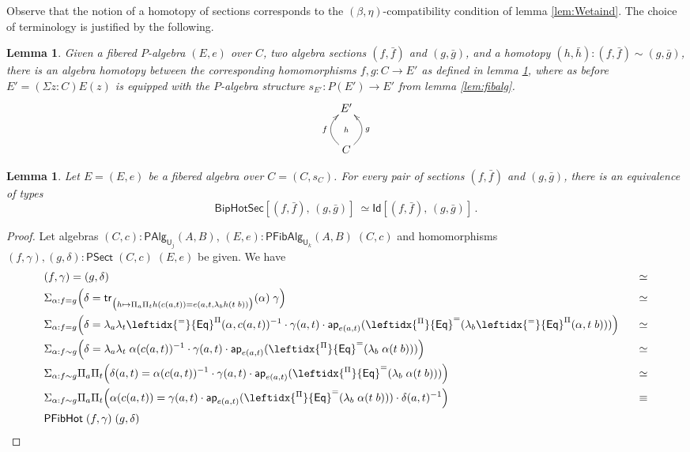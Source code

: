 \documentclass[10pt,a4paper,oneside,reqno]{amsart}
\numberwithin{equation}{section}
\theoremstyle{mythm}
\newtheorem{lemma}[theorem]{Lemma}
\theoremstyle{mydef}
\theoremstyle{myrmk}
\newcommand{\trans}{\mathsf{tr}}
\newcommand{\ct}{\cdot}
\newcommand{\funext}{\leftidx{^\Pi}{\mathsf{Eq}}^{=}}
\newcommand{\happly}{\leftidx{^=}{\mathsf{Eq}}^{\Pi}}
\newcommand{\prd}[1]{\Pi_{#1}}
\newcommand{\sm}[1]{\Sigma_{#1}}
\newcommand{\lam}[1]{\lambda_{#1}}
\newcommand{\app}{\mathsf{ap}}
\newcommand{\Id}{\mathsf{Id}}
\newcommand{\UU}{\mathsf{U}}
\newcommand{\HoSec}{\mathsf{BipHotSec}}
\newcommand{\WFibCell}{\mathsf{PFibHot}}
\newcommand{\WAlg}{\mathsf{PAlg}}
\newcommand{\WFibAlg}{\mathsf{PFibAlg}}
\newcommand{\WFibHom}{\mathsf{PSect}}
\begin{document}
Observe that the notion of a homotopy of sections corresponds to the $(\beta, \eta)$-compatibility condition of lemma \ref{lem:Wetaind}.  The choice of terminology is justified by the following.

\begin{lemma}\label{lem:fibalghom}
Given a fibered $P$-algebra $(E, e)$ over $C$, two algebra sections $(f, \bar{f})$ and $(g, \bar{g})$, and a homotopy $(h, \bar{h}) : (f, \bar{f}) \sim (g, \bar{g})$, there is an algebra  homotopy between the corresponding homomorphisms $f, g : C\to E'$ as defined in lemma \ref{lem:fibalghom}, where as before $E' = (\Sigma z : C) E(z)$ is equipped with the $P$-algebra structure $s_{E'} :P(E')\to E'$ from lemma \ref{lem:fibalg}.
\[
\xymatrix{
 E' \ar@{}[d]|{h} \\ 
C \ar@/^1.2pc/[u]^{f}  \ar@/_1.2pc/[u]_{g}
}
 \]
\end{lemma}




\begin{lemma}\label{lem:fibhomeqid} Let $E = (E, e)$ be a fibered algebra over $C = (C, s_C)$. 
For every pair of sections $(f, \bar{f})$ and $(g, \bar{g})$, 
there is an equivalence of types
\[
\HoSec[ (f, \bar{f}) ,\, (g, \bar{g}) ]\
\simeq 
\Id[ (f, \bar{f}) ,\, (g, \bar{g}) ] \, .
\]
\end{lemma}

\begin{proof}
Let algebras $(C,c) : \WAlg_{\UU_j}(A,B)$, $(E,e) : \WFibAlg_{\UU_k}(A,B) \; (C,c)$ and homomorphisms $(f,\gamma), (g,\delta) : \WFibHom \; (C,c) \; (E,e)$ be given. We have
\begin{alignat*}{4}
& (f,\gamma) = (g,\delta) & \simeq \\
& \sm{\alpha : f = g} \Big(\delta = \trans_{\big(h \mapsto \prd{a}\prd{t} h(c(a,t)) = e(a,t,\lam{b} h(t\;b))\big)}(\alpha) \; \gamma\Big) & \simeq \\
& \sm{\alpha : f = g} \Big(\delta = \lam{a} \lam{t} \happly(\alpha,c(a,t))^{-1} \ct \gamma(a,t) \ct \app_{e(a,t)}(\funext (\lam{b}\happly(\alpha,t \; b))) \Big) & \;\;\; \simeq \\
& \sm{\alpha : f \sim g} \Big(\delta = \lam{a} \lam{t} \; \alpha(c(a,t))^{-1} \ct \gamma(a,t) \ct \app_{e(a,t)}(\funext (\lam{b}\; \alpha(t \; b))) \Big) & \simeq \\
& \sm{\alpha : f \sim g} \prd{a}\prd{t}\Big(\delta(a,t) = \alpha(c(a,t))^{-1} \ct \gamma(a,t) \ct \app_{e(a,t)}(\funext (\lam{b}\; \alpha(t \; b))) \Big) & \simeq \\ 
& \sm{\alpha : f \sim g} \prd{a}\prd{t}\Big(\alpha(c(a,t)) = \gamma(a,t) \ct \app_{e(a,t)}(\funext (\lam{b}\; \alpha(t \; b))) \ct \delta(a,t)^{-1} \Big) & \equiv \\ 
& \WFibCell \; (f,\gamma) \; (g,\delta)
\end{alignat*}
\end{proof}
\end{document}

